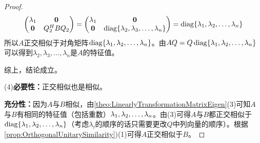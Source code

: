 \begin{proof}
\begin{align*}
\begin{pmatrix}
			\lambda_1 & \mathbf{0} \\
			\mathbf{0} & Q_2^HBQ_2
		\end{pmatrix}
		=
		\begin{pmatrix}
			\lambda_1 & \mathbf{0} \\
			\mathbf{0} & \operatorname{diag}\{\lambda_2,\lambda_3,\dots,\lambda_n\}
		\end{pmatrix}
		=\operatorname{diag}\{\lambda_1, \lambda_2, \dots, \lambda_{n}\}
	\end{align*}
	所以$A$正交相似于对角矩阵$\operatorname{diag}\{\lambda_1, \lambda_2, \dots, \lambda_{n}\}$。由$AQ=Q\operatorname{diag}\{\lambda_1, \lambda_2, \dots, \lambda_{n}\}$可以得到$\lambda_2,\lambda_3,\dots,\lambda_n$是$A$的特征值。\par
	综上，结论成立。\par
	(4)\textbf{必要性：}正交相似也是相似。\par
	\textbf{充分性：}因为$A$与$B$相似，由\cref{theo:LinearlyTransformationMatrixEigen}(3)可知$A$与$B$有相同的特征值（包括重数）$\lambda_1, \lambda_2, \dots, \lambda_{n}$。由(3)可得$A$与$B$都正交相似于$\operatorname{diag}\{\lambda_1, \lambda_2, \dots, \lambda_{n}\}$（考虑$\lambda_i$的顺序的话只需要更改$Q$中列向量的顺序）。根据\cref{prop:OrthogonalUnitarySimilarity})(1)可得$A$正交相似于$B$。
\end{proof}
